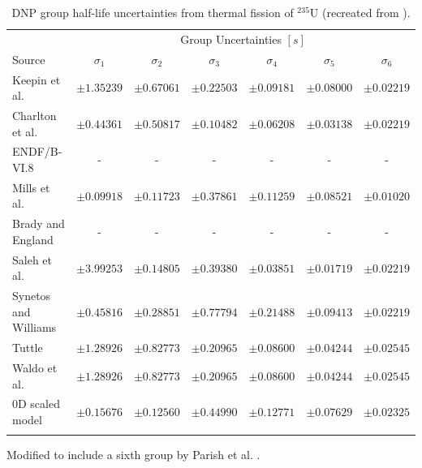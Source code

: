 \begin{table}[!h]
\centering
\begin{threeparttable}
\caption{\gls{DNP} group half-life uncertainties from thermal fission of $^{235}$U (recreated from \cite{parish1999status}).}
\begin{tabular}{lcccccc}
\hline
 & \multicolumn{6}{c}{Group Uncertainties $[s]$} \\
Source & $\sigma_1$ & $\sigma_2$ & $\sigma_3$ & $\sigma_4$ & $\sigma_5$ & $\sigma_6$ \\
\hline
Keepin et al. \cite{keepin1957delayed}   & $\pm1.35239$ & $\pm0.67061$ & $\pm0.22503$ & $\pm0.09181$ & $\pm0.08000$ & $\pm0.02219$ \\
Charlton et al. \cite{charlton1996delayed}\tnote{*} & $\pm0.44361$ & $\pm0.50817$ & $\pm0.10482$ & $\pm0.06208$ & $\pm0.03138$ & $\pm0.02219$ \\
ENDF/B-VI.8 \cite{endf6}   & - & - & - & - & - & - \\
Mills et al. \cite{mills1991study}    & $\pm0.09918$ & $\pm0.11723$ & $\pm0.37861$ & $\pm0.11259$ & $\pm0.08521$ & $\pm0.01020$ \\
Brady and England \cite{brady1989delayed} & - & - & - & - & - & - \\
Saleh et al. \cite{saleh1997measurements} & $\pm3.99253$ & $\pm0.14805$ & $\pm0.39380$ & $\pm0.03851$ & $\pm0.01719$ & $\pm0.02219$ \\
Synetos and Williams \cite{synetos1983delayed}\tnote{*} & $\pm0.45816$ & $\pm0.28851$ & $\pm0.77794$ & $\pm0.21488$ & $\pm0.09413$ & $\pm0.02219$ \\
Tuttle \cite{tuttle1975delayed}    & $\pm1.28926$ & $\pm0.82773$ & $\pm0.20965$ & $\pm0.08600$ & $\pm0.04244$ & $\pm0.02545$ \\
Waldo et al.\cite{waldo1981delayed}    & $\pm1.28926$ & $\pm0.82773$ & $\pm0.20965$ & $\pm0.08600$ & $\pm0.04244$ & $\pm0.02545$ \\
0D scaled model & $\pm0.15676$ & $\pm0.12560$ & $\pm0.44990$ & $\pm0.12771$ & $\pm0.07629$ & $\pm0.02325$\\

\hline
\label{tab:macro-half-lives-delta-net}
\end{tabular}
\begin{tablenotes}
\item[*] Modified to include a sixth group by Parish et al. \cite{parish1999status}.
\end{tablenotes}
\end{threeparttable}
\end{table}

